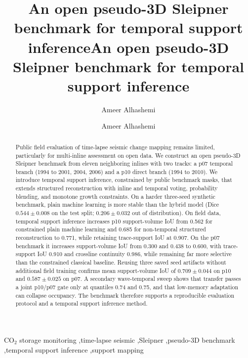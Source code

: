 \documentclass[preprint,12pt]{elsarticle}
\newcommand{\papertitle}{An open pseudo-3D Sleipner benchmark for temporal support inference}
\begin{document}
\ifuseelsarticle
\begin{frontmatter}

\title{\papertitle}

\author[inst1]{Ameer Alhashemi}
\address[inst1]{University of Birmingham, Edgbaston, Birmingham B15 2TT, United Kingdom}

\begin{abstract}
Public field evaluation of time-lapse seismic change mapping remains limited, particularly for multi-inline assessment on open data. We construct an open pseudo-3D Sleipner benchmark from eleven neighboring inlines with two tracks: a p07 temporal branch (1994 to 2001, 2004, 2006) and a p10 direct branch (1994 to 2010). We introduce temporal support inference, constrained by public benchmark masks, that extends structured reconstruction with inline and temporal voting, probability blending, and monotone growth constraints. On a harder three-seed synthetic benchmark, plain machine learning is more stable than the hybrid model (Dice $0.544 \pm 0.008$ on the test split; $0.206 \pm 0.032$ out of distribution). On field data, temporal support inference increases p10 support-volume IoU from 0.562 for constrained plain machine learning and 0.685 for non-temporal structured reconstruction to 0.771, while retaining trace-support IoU at 0.907. On the p07 benchmark it increases support-volume IoU from 0.300 and 0.438 to 0.600, with trace-support IoU 0.910 and crossline continuity 0.986, while remaining far more selective than the constrained classical baseline. Reusing three saved seed artifacts without additional field training confirms mean support-volume IoU of $0.709 \pm 0.044$ on p10 and $0.587 \pm 0.025$ on p07. A secondary wave-temporal sweep shows that transfer passes a joint p10/p07 gate only at quantiles 0.74 and 0.75, and that low-memory adaptation can collapse occupancy. The benchmark therefore supports a reproducible evaluation protocol and a temporal support inference method.
\end{abstract}

\begin{keyword}
CO$_2$ storage monitoring \sep time-lapse seismic \sep Sleipner \sep pseudo-3D benchmark \sep temporal support inference \sep support mapping
\end{keyword}

\end{frontmatter}
\else
\title{\papertitle}
\author{Ameer Alhashemi}
\date{}
\end{document}
